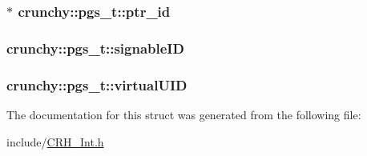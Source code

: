 \subsubsection[{ptr\+\_\+id}]{$\ast$ crunchy\+::pgs\+\_\+t\+::ptr\+\_\+id}\label{structcrunchy_1_1pgs__t_ae7503cb4a27d99838883861d63750817}
\hypertarget{structcrunchy_1_1pgs__t_a9a56b73215866d5bde8455f7752e9572}{}
\subsubsection[{signable\+I\+D}]{ crunchy\+::pgs\+\_\+t\+::signable\+I\+D}\label{structcrunchy_1_1pgs__t_a9a56b73215866d5bde8455f7752e9572}
\hypertarget{structcrunchy_1_1pgs__t_a826bb981b0483387e8c5ae31c0ed106f}{}
\subsubsection[{virtual\+U\+I\+D}]{ crunchy\+::pgs\+\_\+t\+::virtual\+U\+I\+D}\label{structcrunchy_1_1pgs__t_a826bb981b0483387e8c5ae31c0ed106f}


The documentation for this struct was generated from the following file\+:\begin{DoxyCompactItemize}
\item 
include/\hyperlink{_c_r_h___int_8h}{C\+R\+H\+\_\+\+Int.\+h}\end{DoxyCompactItemize}
